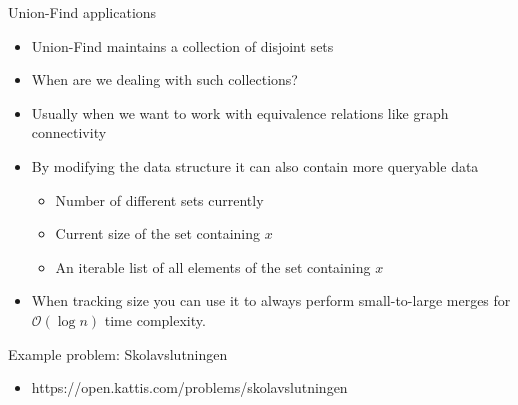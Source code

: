 \documentclass{beamer}
\begin{document}
\begin{frame}[plain]{Union-Find applications}
    \vspace{30pt}
    \begin{itemize}
        \item<1-> Union-Find maintains a collection of disjoint sets
        \item<1-> When are we dealing with such collections?
        \item<2-> Usually when we want to work with equivalence relations like graph connectivity
        \item<2-> By modifying the data structure it can also contain more queryable data
        \begin{itemize}
            \item<2-> Number of different sets currently
            \item<2-> Current size of the set containing $x$
            \item<2-> An iterable list of all elements of the set containing $x$
        \end{itemize}
        \item<3-> When tracking size you can use it to always perform small-to-large merges for $\mathcal{O}(\log n)$ time complexity.
    \end{itemize}
\end{frame}

\begin{frame}[plain]{Example problem: Skolavslutningen}
    \begin{itemize}
        \item https://open.kattis.com/problems/skolavslutningen
    \end{itemize}
\end{frame}
\end{document}
